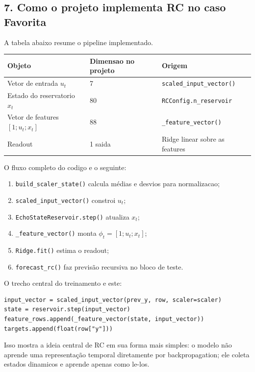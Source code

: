 \documentclass[12pt]{article}
\providecommand{\tightlist}{%
          \setlength{\itemsep}{0pt}\setlength{\parskip}{0pt}}
\begin{document}
\subsection{7. Como o projeto implementa RC no caso Favorita}\label{7-como-o-projeto-implementa-rc-no-caso-favorita}

A tabela abaixo resume o pipeline implementado.

\begin{longtable}[]{@{}lll@{}}
\toprule\noalign{}
Objeto & Dimensao no projeto & Origem \\
\midrule\noalign{}
\endhead
\bottomrule\noalign{}
\endlastfoot
Vetor de entrada \(u_t\) & 7 & \texttt{scaled\_input\_vector()} \\
Estado do reservatorio \(x_t\) & 80 & \texttt{RCConfig.n\_reservoir} \\
Vetor de features \([1; u_t; x_t]\) & 88 & \texttt{\_feature\_vector()} \\
Readout & 1 saida & Ridge linear sobre as features \\
\end{longtable}

O fluxo completo do codigo e o seguinte:

\begin{enumerate}
\def\labelenumi{\arabic{enumi}.}
\tightlist
\item
  \texttt{build\_scaler\_state()} calcula médias e desvios para normalizacao;
\item
  \texttt{scaled\_input\_vector()} constroi \(u_t\);
\item
  \texttt{EchoStateReservoir.step()} atualiza \(x_t\);
\item
  \texttt{\_feature\_vector()} monta \(\phi_t = [1; u_t; x_t]\);
\item
  \texttt{Ridge.fit()} estima o readout;
\item
  \texttt{forecast\_rc()} faz previsão recursiva no bloco de teste.
\end{enumerate}

O trecho central do treinamento e este:

\begin{verbatim}
input_vector = scaled_input_vector(prev_y, row, scaler=scaler)
state = reservoir.step(input_vector)
feature_rows.append(_feature_vector(state, input_vector))
targets.append(float(row["y"]))
\end{verbatim}

Isso mostra a ideia central de RC em sua forma mais simples: o modelo não aprende uma representação temporal diretamente por backpropagation; ele coleta estados dinamicos e aprende apenas como le-los.
\end{document}
